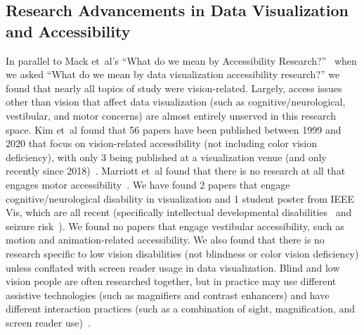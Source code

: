 \documentclass{egpubl}
\newcommand{\ea}{{et~al\xperiod}\xspace}
\begin{document}
\subsection{Research Advancements in Data Visualization and Accessibility}
In parallel to Mack \ea's ``What do we mean by Accessibility Research?''~\cite{mack_what_2021} when we asked ``What do we mean by data visualization accessibility research?'' we found that nearly all topics of study were vision-related. Largely, access issues other than vision that affect data visualization (such as cognitive/neurological, vestibular, and motor concerns) are almost entirely unserved in this research space. Kim \ea found that 56 papers have been published between 1999 and 2020 that focus on vision-related accessibility (not including color vision deficiency), with only 3 being published at a visualization venue (and only recently since 2018)~\cite{kim_accessible_2021}. Marriott \ea found that there is no research at all that engages motor accessibility~\cite{marriott_inclusive_2021}. We have found 2 papers that engage cognitive/neurological disability in visualization and 1 student poster from IEEE Vis, which are all recent (specifically intellectual developmental disabilities~\cite{wu_understanding_2021} and seizure risk~\cite{south_generating_2020,south_detecting_2021}). We found no papers that engage vestibular accessibility, such as motion and animation-related accessibility. We also found that there is no research specific to low vision disabilities (not blindness or color vision deficiency) unless conflated with screen reader usage in data visualization. Blind and low vision people are often researched together, but in practice may use different assistive technologies (such as magnifiers and contrast enhancers) and have different interaction practices (such as a combination of sight, magnification, and screen reader use)~\cite{szpiro_2016}. 
\end{document}
